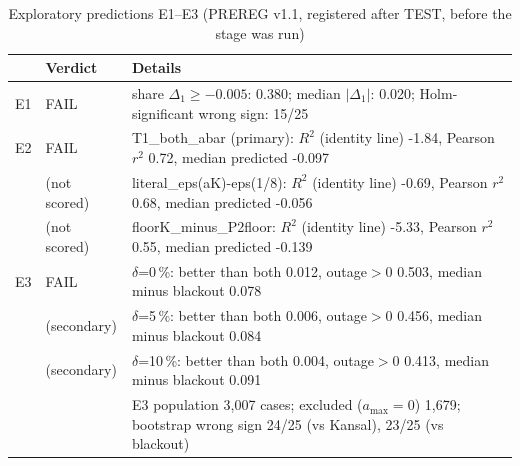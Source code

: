 \begin{table}[H]\centering\footnotesize\caption{Exploratory predictions E1--E3 (PREREG v1.1, registered after TEST, before the stage was run)}\label{tab:s_explore}
\begin{tabular}{@{}llp{}@{}}\toprule
 & Verdict & Details\\\midrule
E1 & FAIL & share $\Delta_1\ge-0.005$: 0.380; median $|\Delta_1|$: 0.020; Holm-significant wrong sign: 15/25\\
E2 & FAIL & T1\_both\_abar (primary): $R^2$ (identity line) -1.84, Pearson $r^2$ 0.72, median predicted -0.097\\
 & (not scored) & literal\_eps(aK)-eps(1/8): $R^2$ (identity line) -0.69, Pearson $r^2$ 0.68, median predicted -0.056\\
 & (not scored) & floorK\_minus\_P2floor: $R^2$ (identity line) -5.33, Pearson $r^2$ 0.55, median predicted -0.139\\
E3 & FAIL & $\delta$=0\,\%: better than both 0.012, outage$>0$ 0.503, median minus blackout 0.078\\
 & (secondary) & $\delta$=5\,\%: better than both 0.006, outage$>0$ 0.456, median minus blackout 0.084\\
 & (secondary) & $\delta$=10\,\%: better than both 0.004, outage$>0$ 0.413, median minus blackout 0.091\\
 &  & E3 population 3{,}007 cases; excluded ($a_{\max}=0$) 1{,}679; bootstrap wrong sign 24/25 (vs Kansal), 23/25 (vs blackout)\\
\bottomrule\end{tabular}\end{table}

